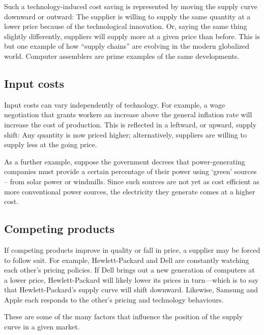 Such a technology-induced cost saving is represented by moving the supply curve downward or outward: The supplier is willing to supply the same quantity at a lower price because of the technological innovation. Or, saying the same thing slightly differently, suppliers will supply more at a given price than before. This is but one example of how ``supply chains'' are evolving in the modern globalized world. Computer assemblers are prime examples of the same developments.

\subsection*{Input costs}

Input costs can vary independently of technology. For example, a wage negotiation that grants workers an increase above the general inflation rate will increase the cost of production. This is reflected in a leftward, or upward, supply shift: Any quantity is now priced higher; alternatively, suppliers are willing to supply less at the going price.

As a further example, suppose the government decrees that power-generating companies must provide a certain percentage of their power using `green' sources -- from solar power or windmills. Since such sources are not yet as cost efficient as more conventional power sources, the electricity they generate comes at a higher cost.

\subsection*{Competing products}

If competing products improve in quality or fall in price, a supplier may be forced to follow suit. For example, Hewlett-Packard and Dell are constantly watching each other's pricing policies. If Dell brings out a new generation of computers at a lower price, Hewlett-Packard will likely lower its prices in turn---which is to say that Hewlett-Packard's supply curve will shift downward. Likewise, Samsung and Apple each responds to the other's pricing and technology behaviours.

These are some of the many factors that influence the position of the supply curve in a given market.

